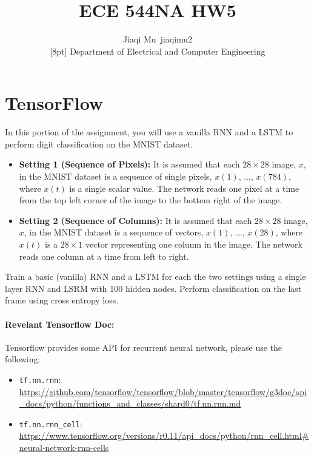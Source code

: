 \documentclass[12pt]{article}
\newcommand{\1}{\mathbf{1}}
\begin{document}
{\raggedright


\title{ECE 544NA HW5}%
\author{Jiaqi Mu~jiaqimu2 \\
[8pt]%
Department of Electrical and Computer Engineering} %

\maketitle

\section{TensorFlow}
In this portion of the assignment, you will use a vanilla RNN and a LSTM to perform digit classification on the MNIST dataset.

\begin{itemize}
  \item {\bf Setting 1 (Sequence of Pixels):} It is assumed that each $28\times 28$ image, $x$, in the MNIST dataset is a sequence of single pixels, $x(1)$, ..., $x(784)$, where $x(t)$ is a single scalar value. The network reads one pixel at a time from the top left corner of the image to the bottem right of the image.
  \item {\bf Setting 2 (Sequence of Columns):} It is assumed that each $28\times 28$ image, $x$, in the MNIST dataset is a sequence of vectors, $x(1)$, ..., $x(28)$, where $x(t)$ is a $28\times 1$ vector representing one column in the image. The network reads one column at a time from left to right.
\end{itemize}

Train a basic (vanilla) RNN and a LSTM for each the two settings using a single layer RNN and LSRM with 100 hidden nodes. Perform classification on the last frame using cross entropy loss. 

\paragraph{Revelant Tensorflow Doc:} Tensorflow provides some API for recurrent neural network, please use the following:
\begin{itemize}
  \item {\tt tf.nn.rnn}: \url{https://github.com/tensorflow/tensorflow/blob/master/tensorflow/g3doc/api_docs/python/functions_and_classes/shard0/tf.nn.rnn.md}
  \item {\tt tf.nn.rnn\_cell}: \url{https://www.tensorflow.org/versions/r0.11/api_docs/python/rnn_cell.html#neural-network-rnn-cells}
\end{itemize}

}
\end{document}
